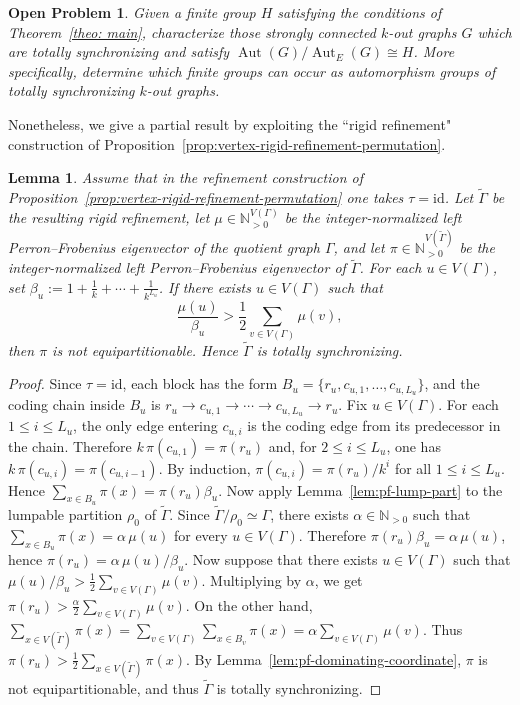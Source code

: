 \documentclass[a4paper,10pt]{amsart}
\theoremstyle{plain}
\newtheorem{lemma}[theorem]{Lemma}
\newtheorem{open}[theorem]{Open Problem}
\theoremstyle{definition}
\DeclareMathOperator{\Aut}{Aut}
\newcommand{\id}{\mathrm{id}}
\begin{document}
\begin{open}
Given a finite group $H$ satisfying the conditions of Theorem~\ref{theo: main}, characterize those strongly connected $k$-out graphs $G$ which are totally synchronizing and satisfy $\Aut(G)/\Aut_E(G)\cong H$. More specifically, determine which finite groups can occur as automorphism groups of totally synchronizing $k$-out graphs.
\end{open}
Nonetheless, we give a partial result by exploiting the ``rigid refinement" construction of Proposition~\ref{prop:vertex-rigid-refinement-permutation}.


\begin{lemma}\label{lem:id-refinement-pf-criterion}
Assume that in the refinement construction of Proposition~\ref{prop:vertex-rigid-refinement-permutation} one takes $\tau=\id$. Let $\widetilde\Gamma$ be the resulting rigid refinement, let $\mu\in \mathbb N_{>0}^{V(\Gamma)}$ be the integer-normalized left Perron--Frobenius eigenvector of the quotient graph $\Gamma$, and let $\pi\in\mathbb N_{>0}^{V(\widetilde\Gamma)}$ be the integer-normalized left Perron--Frobenius eigenvector of $\widetilde\Gamma$. For each $u\in V(\Gamma)$, set $\beta_u:=1+\frac1k+\cdots+\frac1{k^{L_u}}$. If there exists $u\in V(\Gamma)$ such that
\[
\frac{\mu(u)}{\beta_u}>\frac12\sum_{v\in V(\Gamma)}\mu(v),
\]
then $\pi$ is not equipartitionable. Hence $\widetilde\Gamma$ is totally synchronizing.
\end{lemma}
\begin{proof}
Since $\tau=\id$, each block has the form $B_u=\{r_u,c_{u,1},\dots,c_{u,L_u}\}$, and the coding chain inside $B_u$ is $r_u\to c_{u,1}\to \cdots \to c_{u,L_u}\to r_u$. Fix $u\in V(\Gamma)$. For each $1\le i\le L_u$, the only edge entering $c_{u,i}$ is the coding edge from its predecessor in the chain. Therefore $k\,\pi(c_{u,1})=\pi(r_u)$ and, for $2\le i\le L_u$, one has $k\,\pi(c_{u,i})=\pi(c_{u,i-1})$. By induction, $\pi(c_{u,i})=\pi(r_u)/k^i$ for all $1\le i\le L_u$. Hence
\(
\sum_{x\in B_u}\pi(x)=\pi(r_u)\beta_u.
\)
Now apply Lemma~\ref{lem:pf-lump-part} to the lumpable partition $\rho_0$ of $\widetilde\Gamma$. Since $\widetilde\Gamma/\rho_0\simeq \Gamma$, there exists $\alpha\in\mathbb N_{>0}$ such that $\sum_{x\in B_u}\pi(x)=\alpha\,\mu(u)$ for every $u\in V(\Gamma)$. Therefore $\pi(r_u)\beta_u=\alpha\,\mu(u)$, hence $\pi(r_u)=\alpha\,\mu(u)/\beta_u$.
Now suppose that there exists $u\in V(\Gamma)$ such that $\mu(u)/\beta_u>\frac12\sum_{v\in V(\Gamma)}\mu(v)$. Multiplying by $\alpha$, we get $\pi(r_u)>\frac{\alpha}{2}\sum_{v\in V(\Gamma)}\mu(v)$. On the other hand, $\sum_{x\in V(\widetilde\Gamma)}\pi(x)=\sum_{v\in V(\Gamma)}\sum_{x\in B_v}\pi(x)=\alpha\sum_{v\in V(\Gamma)}\mu(v)$. Thus
\(
\pi(r_u)>\frac12\sum_{x\in V(\widetilde\Gamma)}\pi(x).
\)
By Lemma~\ref{lem:pf-dominating-coordinate}, $\pi$ is not equipartitionable, and thus $\widetilde\Gamma$ is totally synchronizing.
\end{proof}
\end{document}
